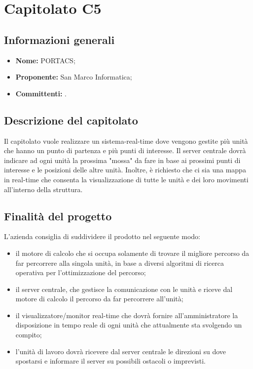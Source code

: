 \section{Capitolato C5}

\subsection{Informazioni generali}
\begin{itemize}
\item \textbf{Nome:} PORTACS;
\item \textbf{Proponente:} San Marco Informatica;
\item \textbf{Committenti:} \committenti{}.
\end{itemize}

\subsection{Descrizione del capitolato}
Il capitolato vuole realizzare un sistema-real-time dove vengono gestite più unità che hanno un punto di partenza e più punti di interesse.
Il server centrale dovrà indicare ad ogni unità la prossima "mossa" da fare in base ai prossimi punti di interesse e le posizioni delle altre unità. 
Inoltre, è richiesto che ci sia una mappa in real-time che consenta la visualizzazione di tutte le unità e dei loro movimenti all'interno della struttura.

\subsection{Finalità del progetto}
L'azienda consiglia di suddividere il prodotto nel seguente modo:
\begin{itemize}
\item il motore di calcolo che si occupa solamente di trovare il migliore percorso da far percorrere alla singola unità, in base a diversi algoritmi di ricerca operativa per l'ottimizzazione del percorso;
\item il server centrale, che gestisce la comunicazione con le unità e riceve dal motore di calcolo il percorso da far percorrere all'unità;
\item il visualizzatore/monitor real-time che dovrà fornire all'amministratore la disposizione in tempo reale di ogni unità che attualmente sta svolgendo un compito;
\item l'unità di lavoro dovrà ricevere dal server centrale le direzioni su dove spostarsi e informare il server su possibili ostacoli o imprevisti.
\end{itemize}

